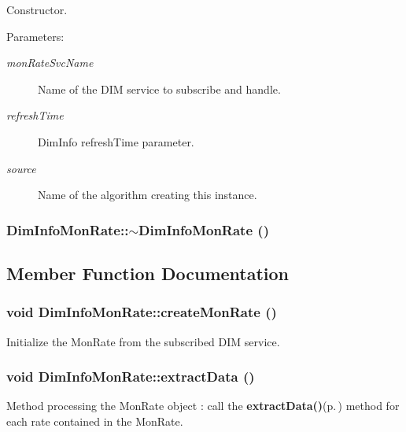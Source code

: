 Constructor.

\begin{Desc}
\item[Parameters:]
\begin{description}
\item[{\em mon\-Rate\-Svc\-Name}]Name of the DIM service to subscribe and handle. \item[{\em refresh\-Time}]Dim\-Info refresh\-Time parameter. \item[{\em source}]Name of the algorithm creating this instance.\end{description}
\end{Desc}
\subsubsection{\setlength{\rightskip}{0pt plus 5cm}Dim\-Info\-Mon\-Rate::$\sim${\bf Dim\-Info\-Mon\-Rate} ()\hspace{0.3cm}{\tt  [virtual]}}\label{classDimInfoMonRate_a1}




\subsection{Member Function Documentation}
\subsubsection{\setlength{\rightskip}{0pt plus 5cm}void Dim\-Info\-Mon\-Rate::create\-Mon\-Rate ()}\label{classDimInfoMonRate_a2}


Initialize the Mon\-Rate from the subscribed DIM service.
\subsubsection{\setlength{\rightskip}{0pt plus 5cm}void Dim\-Info\-Mon\-Rate::extract\-Data ()\hspace{0.3cm}{\tt  [private]}}\label{classDimInfoMonRate_d0}


Method processing the Mon\-Rate object : call the {\bf extract\-Data()}{\rm (p.\,\pageref{classDimInfoMonRate_d0})} method for each rate contained in the Mon\-Rate.
